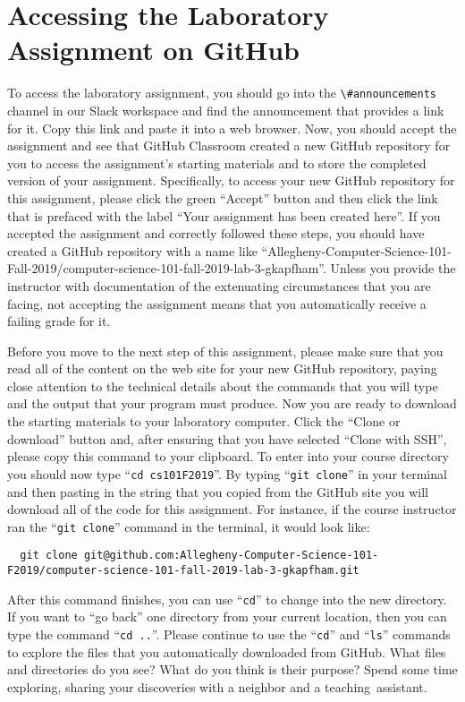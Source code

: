 \documentclass[11pt]{article}
\newcommand{\command}[1]{``\lstinline{#1}''}
\newcommand{\channel}[1]{\lstinline{#1}}
\newcommand{\step}[1]{``{#1}''}
\begin{document}
\section*{Accessing the Laboratory Assignment on GitHub}

To access the laboratory assignment, you should go into the
\channel{\#announcements} channel in our Slack workspace and find the
announcement that provides a link for it. Copy this link and paste it into a web
browser. Now, you should accept the assignment and see that GitHub Classroom
created a new GitHub repository for you to access the assignment's starting
materials and to store the completed version of your assignment. Specifically,
to access your new GitHub repository for this assignment, please click the green
``Accept'' button and then click the link that is prefaced with the label ``Your
assignment has been created here''. If you accepted the assignment and correctly
followed these steps, you should have created a GitHub repository with a name
like
``Allegheny-Computer-Science-101-Fall-2019/computer-science-101-fall-2019-lab-3-gkapfham''.
Unless you provide the instructor with documentation of the extenuating
circumstances that you are facing, not accepting the assignment means that you
automatically receive a failing grade for it.

Before you move to the next step of this assignment, please make sure that you
read all of the content on the web site for your new GitHub repository, paying
close attention to the technical details about the commands that you will type
and the output that your program must produce. Now you are ready to download the
starting materials to your laboratory computer. Click the ``Clone or download''
button and, after ensuring that you have selected ``Clone with SSH'', please
copy this command to your clipboard. To enter into your course directory you
should now type \command{cd cs101F2019}. By typing \command{git clone} in your
terminal and then pasting in the string that you copied from the GitHub site you
will download all of the code for this assignment. For instance, if the course
instructor ran the \command{git clone} command in the terminal, it would look
like:

\begin{lstlisting}
  git clone git@github.com:Allegheny-Computer-Science-101-F2019/computer-science-101-fall-2019-lab-3-gkapfham.git
\end{lstlisting}

After this command finishes, you can use \command{cd} to change into the new
directory. If you want to \step{go back} one directory from your current
location, then you can type the command \command{cd ..}. Please continue to use
the \command{cd} and \command{ls} commands to explore the files that you
automatically downloaded from GitHub. What files and directories do you see?
What do you think is their purpose? Spend some time exploring, sharing your
discoveries with a neighbor and a \mbox{teaching assistant}.
\end{document}
